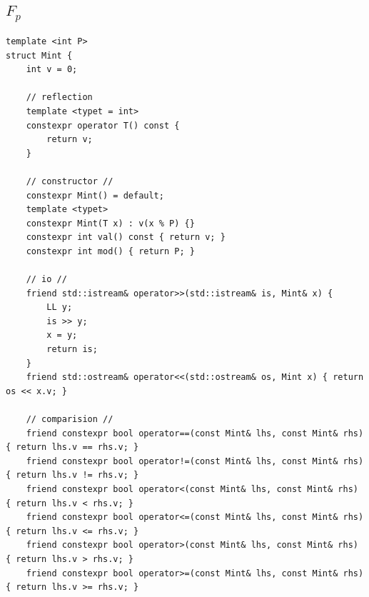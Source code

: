 \documentclass[UTF8, a4paper, titlepage, twoside]{ctexart}
\begin{document}
\subsection { \(F_p\) }
\begin{lstlisting}[style=cpp]
template <int P>
struct Mint {
    int v = 0;

    // reflection
    template <typet = int>
    constexpr operator T() const {
        return v;
    }

    // constructor //
    constexpr Mint() = default;
    template <typet>
    constexpr Mint(T x) : v(x % P) {}
    constexpr int val() const { return v; }
    constexpr int mod() { return P; }

    // io //
    friend std::istream& operator>>(std::istream& is, Mint& x) {
        LL y;
        is >> y;
        x = y;
        return is;
    }
    friend std::ostream& operator<<(std::ostream& os, Mint x) { return os << x.v; }

    // comparision //
    friend constexpr bool operator==(const Mint& lhs, const Mint& rhs) { return lhs.v == rhs.v; }
    friend constexpr bool operator!=(const Mint& lhs, const Mint& rhs) { return lhs.v != rhs.v; }
    friend constexpr bool operator<(const Mint& lhs, const Mint& rhs) { return lhs.v < rhs.v; }
    friend constexpr bool operator<=(const Mint& lhs, const Mint& rhs) { return lhs.v <= rhs.v; }
    friend constexpr bool operator>(const Mint& lhs, const Mint& rhs) { return lhs.v > rhs.v; }
    friend constexpr bool operator>=(const Mint& lhs, const Mint& rhs) { return lhs.v >= rhs.v; }


\end{lstlisting}
\end{document}
